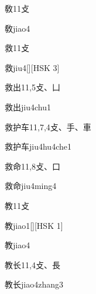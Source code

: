 \begin{entry}{敎}{11}{⽁}
  \begin{phonetics}{敎}{jiao4}
  \end{phonetics}
\end{entry}

\begin{entry}{救}{11}{⽁}
  \begin{phonetics}{救}{jiu4}[][HSK 3]
  \end{phonetics}
\end{entry}

\begin{entry}{救出}{11,5}{⽁、⼐}
  \begin{phonetics}{救出}{jiu4chu1}
  \end{phonetics}
\end{entry}

\begin{entry}{救护车}{11,7,4}{⽁、⼿、⾞}
  \begin{phonetics}{救护车}{jiu4hu4che1}
  \end{phonetics}
\end{entry}

\begin{entry}{救命}{11,8}{⽁、⼝}
  \begin{phonetics}{救命}{jiu4ming4}
  \end{phonetics}
\end{entry}

\begin{entry}{教}{11}{⽁}
  \begin{phonetics}{教}{jiao1}[][HSK 1]
  \end{phonetics}
  \begin{phonetics}{教}{jiao4}
  \end{phonetics}
\end{entry}

\begin{entry}{教长}{11,4}{⽁、⾧}
  \begin{phonetics}{教长}{jiao4zhang3}
  \end{phonetics}
\end{entry}

